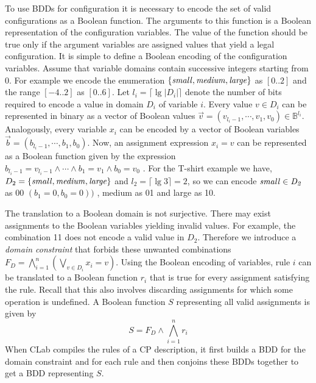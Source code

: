 \documentclass{article}
\begin{document}
To use BDDs for configuration it is necessary to encode the set of
valid configurations as a Boolean function. The arguments to this
function is a Boolean representation of the configuration
variables. The value of the function should be true only if the
argument variables are assigned values that yield a legal
configuration.  It is simple to define a Boolean encoding of the
configuration variables. Assume that variable domains contain
successive integers starting from 0. For example we encode the
enumeration $\{ {\it small}, {\it medium}, {\it large} \}$ as $[0..2]$
and the range $[-4..2]$ as $[0..6]$. Let $l_i = \lceil \lg|D_i|
\rceil$ denote the number of bits required to encode a value in domain
$D_i$ of variable $i$. Every value $v \in D_i$ can be represented in binary as a
vector of Boolean values $\vec{v} = (v_{l_i-1},\cdots,v_1,v_0) \in
\mathbb{B}^{l_i}$. Analogously, every variable $x_i$ can be encoded by
a vector of Boolean variables $\vec{b} =
(b_{l_i-1},\cdots,b_1,b_0)$. Now, an assignment expression $x_i = v$ can be
represented as a Boolean function given by the expression $b_{l_i-1} =
v_{l_i-1} \wedge \cdots \wedge b_1 = v_1 \wedge b_0 = v_0$ . For the T-shirt example we have, $D_2 = \{{\it
small},{\it medium},{\it large}\}$ and $l_2 = \lceil \lg 3 \rceil =
2$, so we can encode ${\it small \in D_2}$ as 00 $(b_1 = 0,b_0 = 0))$
, medium as 01 and large as 10.

The translation to a Boolean domain is not surjective. There may exist
assignments to the Boolean variables yielding invalid values. For
example, the combination 11 does not encode a valid value in
$D_2$. Therefore we introduce a {\em domain constraint} that forbids
these unwanted combinations $F_D = \bigwedge_{i=1}^n (\bigvee_{v \in
D_i} x_i = v)$. Using the Boolean encoding of variables, rule $i$ can
be translated to a Boolean function $r_i$ that is true for every
assignment satisfying the rule. Recall that this also involves
discarding assignments for which some operation is undefined. A
Boolean function $S$ representing all valid assignments is given by
$$
S = F_D \wedge \bigwedge_{i=1}^n r_i
$$
When CLab compiles the rules of a CP description, it first builds a
BDD for the domain constraint and for each rule and then conjoins these 
BDDs together to get a BDD representing $S$.
\end{document}
